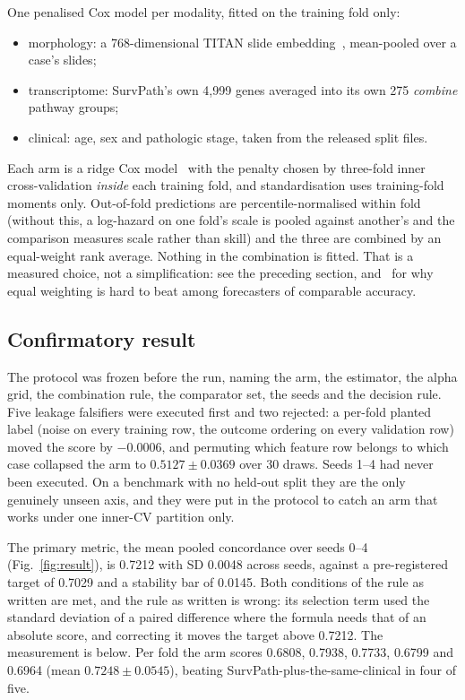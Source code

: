 \documentclass[11pt]{article}
\begin{document}
One penalised Cox model per modality, fitted on the training fold only:

\begin{itemize}
  \item morphology: a 768-dimensional TITAN slide embedding~\citep{ding2025titan},
    mean-pooled over a case's slides;
  \item transcriptome: SurvPath's own 4,999 genes averaged into its own 275
    \emph{combine} pathway groups;
  \item clinical: age, sex and pathologic stage, taken from the released split files.
\end{itemize}

Each arm is a ridge Cox model~\citep{cox1972regression,simon2011regularization} with the penalty
chosen by three-fold inner cross-validation \emph{inside} each training fold, and standardisation uses
training-fold moments only. Out-of-fold predictions are percentile-normalised within fold (without this, a log-hazard on one fold's scale is pooled against another's and the comparison measures scale rather than skill) and the three are combined by an equal-weight rank average. Nothing
in the combination is fitted. That is a measured choice, not a simplification: see the preceding
section, and~\citet{bates1969combination} for why equal weighting is hard to beat among forecasters
of comparable accuracy.

\subsection{Confirmatory result}

The protocol was frozen before the run, naming the
arm, the estimator, the alpha grid, the combination rule, the comparator set, the seeds and the
decision rule. Five leakage falsifiers were executed first and two rejected: a per-fold planted
label (noise on every training row, the outcome ordering on every validation row) moved the
score by $-0.0006$, and permuting which feature row belongs to which case collapsed the arm to
$0.5127 \pm 0.0369$ over 30 draws. Seeds 1--4 had never been executed. On a benchmark with no
held-out split they are the only genuinely unseen axis, and they were put in the protocol to catch
an arm that works under one inner-CV partition only.

The primary metric, the mean pooled concordance over seeds 0--4 (Fig.~\ref{fig:result}), is 0.7212 with SD 0.0048 across seeds, against a pre-registered target of 0.7029 and a stability bar of 0.0145. Both conditions of the rule as written are met, and the rule as written is wrong: its selection term used the standard deviation of a paired difference where the formula needs that of an absolute score, and correcting it moves the target above 0.7212. The measurement is below. Per fold the arm scores 0.6808, 0.7938,
0.7733, 0.6799 and 0.6964 (mean $0.7248 \pm 0.0545$), beating SurvPath-plus-the-same-clinical in
four of five.
\end{document}
